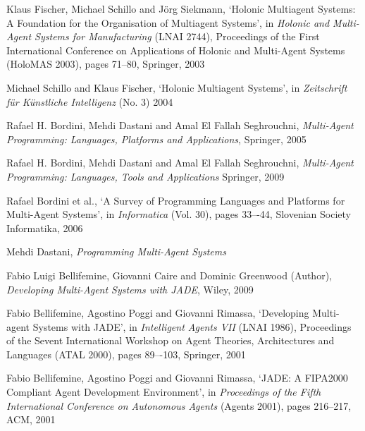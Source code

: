 \begin{thebibliography}{99}
Klaus Fischer, Michael Schillo and J\"{o}rg Siekmann,
`Holonic Multiagent Systems: A Foundation for the Organisation of Multiagent Systems',
in \textit{Holonic and Multi-Agent Systems for Manufacturing} (LNAI 2744),
Proceedings of the First International Conference on Applications of Holonic and Multi-Agent Systems (HoloMAS 2003),
pages 71--80,
Springer, 2003

Michael Schillo and Klaus Fischer,
`Holonic Multiagent Systems',
in \textit{Zeitschrift für Künstliche Intelligenz} (No. 3)
2004


Rafael H. Bordini, Mehdi Dastani and Amal El Fallah Seghrouchni,
\textit{Multi-Agent Programming: Languages, Platforms and Applications},
Springer, 2005

Rafael H. Bordini, Mehdi Dastani and Amal El Fallah Seghrouchni,
\textit{Multi-Agent Programming: Languages, Tools and Applications}
Springer, 2009

Rafael Bordini et al.,
`A Survey of Programming Languages and Platforms for Multi-Agent Systems',
in \textit{Informatica} (Vol. 30),
pages 33–-44,
Slovenian Society Informatika, 2006

Mehdi Dastani,
\textit{Programming Multi-Agent Systems}


Fabio Luigi Bellifemine, Giovanni Caire and Dominic Greenwood (Author),
\textit{Developing Multi-Agent Systems with JADE},
Wiley, 2009

Fabio Bellifemine, Agostino Poggi and Giovanni Rimassa,
`Developing Multi-agent Systems with JADE',
in \textit{Intelligent Agents VII} (LNAI 1986),
Proceedings of the Sevent International Workshop on Agent Theories, Architectures and Languages (ATAL 2000),
pages 89–-103,
Springer, 2001

Fabio Bellifemine, Agostino Poggi and Giovanni Rimassa,
`JADE: A FIPA2000 Compliant Agent Development Environment',
in \textit{Proceedings of the Fifth International Conference on Autonomous Agents} (Agents 2001),
pages 216--217,
ACM, 2001


\end{thebibliography}
